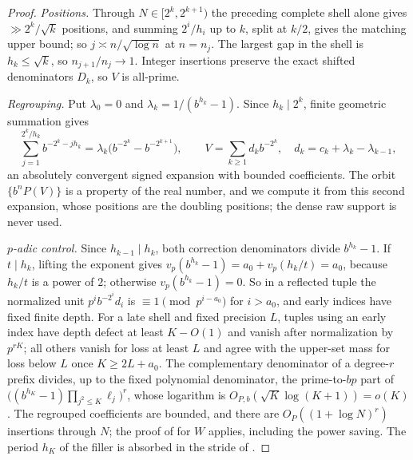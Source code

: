 \documentclass[11pt]{article}
\newcommand{\fr}[1]{\{#1\}}
\begin{document}
\begin{proof}
\emph{Positions.} Through $N\in[2^k,2^{k+1})$ the preceding complete shell alone gives $\gg2^k/\sqrt k$ positions, and summing $2^i/h_i$ up to
$k$, split at $k/2$, gives the matching upper bound; so $j\asymp n/\sqrt{\log n}$ at $n=n_j$. The largest gap in the shell is
$h_k\le\sqrt k$, so $n_{j+1}/n_j\to1$. Integer insertions preserve the exact shifted denominators $D_k$, so $V$ is all-prime.

\emph{Regrouping.} Put $\lambda_0=0$ and $\lambda_k=1/(b^{h_k}-1)$. Since $h_k\mid2^k$, finite geometric summation gives
\[
\sum_{j=1}^{2^k/h_k}b^{-2^k-jh_k}=\lambda_k\bigl(b^{-2^k}-b^{-2^{k+1}}\bigr),\qquad V=\sum_{k\ge1}d_kb^{-2^k},\quad d_k=c_k+\lambda_k-\lambda_{k-1},
\]
an absolutely convergent signed expansion with bounded coefficients. The orbit $\fr{b^nP(V)}$ is a property of the real number,
and we compute it from this second expansion, whose positions are the doubling positions; the dense raw support is never used.

\emph{$p$-adic control.} Since $h_{k-1}\mid h_k$, both correction denominators divide $b^{h_k}-1$. If $t\mid h_k$, lifting the exponent
gives $v_p(b^{h_k}-1)=a_0+v_p(h_k/t)=a_0$, because $h_k/t$ is a power of $2$; otherwise $v_p(b^{h_k}-1)=0$. So in a reflected tuple the
normalized unit $p^ib^{-2^i}d_i$ is $\equiv1\pmod{p^{i-a_0}}$ for $i>a_0$, and early indices have fixed finite depth. For a late shell and
fixed precision $L$, tuples using an early index have depth defect at least $K-O(1)$ and vanish after normalization by $p^{rK}$;
all others vanish for loss at least $L$ and agree with the upper-set mass for loss below $L$ once $K\ge2L+a_0$. The complementary
denominator of a degree-$r$ prefix divides, up to the fixed polynomial denominator, the prime-to-$bp$ part of
$\bigl((b^{h_K}-1)\prod_{j^2\le K}\ell_j\bigr)^r$, whose logarithm is $O_{P,b}(\sqrt K\log(K+1))=o(K)$. The regrouped coefficients are bounded,
and there are $O_P((1+\log N)^r)$ insertions through $N$; the proof of  for $W$ applies, including the power
saving. The period $h_K$ of the filler is absorbed in the stride of .


\end{proof}
\end{document}
